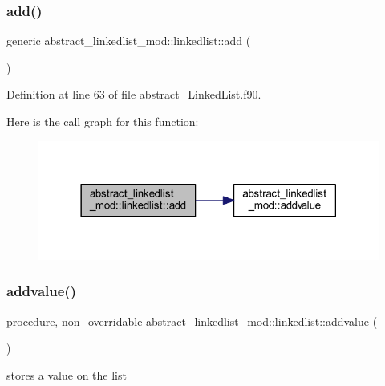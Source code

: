 \subsubsection{\texorpdfstring{add()}{add()}}
{\footnotesize\ttfamily generic abstract\+\_\+linkedlist\+\_\+mod\+::linkedlist\+::add (\begin{DoxyParamCaption}{ }\end{DoxyParamCaption})\hspace{0.3cm}{\ttfamily [private]}}



Definition at line 63 of file abstract\+\_\+\+Linked\+List.\+f90.

Here is the call graph for this function\+:\nopagebreak
\begin{figure}[H]
\begin{center}
\leavevmode
\includegraphics[width=318pt]{structabstract__linkedlist__mod_1_1linkedlist_a4962955d0f6e8fc46cccaa41e5f32b67_cgraph}
\end{center}
\end{figure}
\mbox{\label{structabstract__linkedlist__mod_1_1linkedlist_a4b70f9966ccea6a96228341fb0e0eaf5}} 
\subsubsection{\texorpdfstring{addvalue()}{addvalue()}}
{\footnotesize\ttfamily procedure, non\+\_\+overridable abstract\+\_\+linkedlist\+\_\+mod\+::linkedlist\+::addvalue (\begin{DoxyParamCaption}{ }\end{DoxyParamCaption})\hspace{0.3cm}{\ttfamily [private]}}



stores a value on the list 



